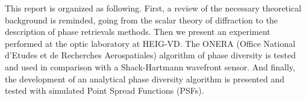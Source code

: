 \vspace{1cm}

This report is organized as following. First, a review of the necessary theoretical background is reminded, going from the scalar theory of diffraction to the description of phase retrievals methods. Then we present an experiment performed at the optic laboratory at HEIG-VD. The ONERA (Office National d'Etudes et de Recherches Aerospatiales) algorithm of phase diversity is tested and used in comparison with a Shack-Hartmann wavefront sensor. And finally, the development of an analytical phase diversity algorithm is presented and tested with simulated Point Spread Functions (PSFs).
